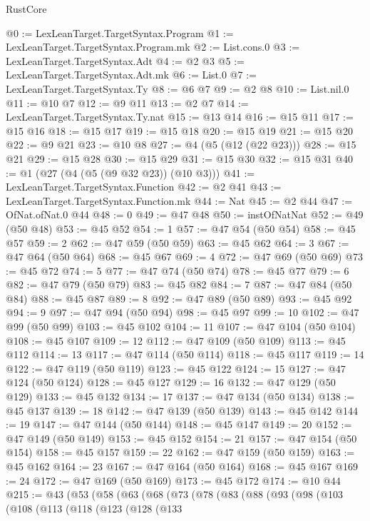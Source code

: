\begin{lexlean}{RustCore}
\begin{coremodule}
@0 := LexLeanTarget.TargetSyntax.Program
@1 := LexLeanTarget.TargetSyntax.Program.mk
@2 := List.cons.{0}
@3 := LexLeanTarget.TargetSyntax.Adt
@4 := @2 @3
@5 := LexLeanTarget.TargetSyntax.Adt.mk
@6 := List.{0}
@7 := LexLeanTarget.TargetSyntax.Ty
@8 := @6 @7
@9 := @2 @8
@10 := List.nil.{0}
@11 := @10 @7
@12 := @9 @11
@13 := @2 @7
@14 := LexLeanTarget.TargetSyntax.Ty.nat
@15 := @13 @14
@16 := @15 @11
@17 := @15 @16
@18 := @15 @17
@19 := @15 @18
@20 := @15 @19
@21 := @15 @20
@22 := @9 @21
@23 := @10 @8
@27 := @4 (@5 (@12 (@22 @23)))
@28 := @15 @21
@29 := @15 @28
@30 := @15 @29
@31 := @15 @30
@32 := @15 @31
@40 := @1 (@27 (@4 (@5 (@9 @32 @23)) (@10 @3)))
@41 := LexLeanTarget.TargetSyntax.Function
@42 := @2 @41
@43 := LexLeanTarget.TargetSyntax.Function.mk
@44 := Nat
@45 := @2 @44
@47 := OfNat.ofNat.{0} @44
@48 := 0
@49 := @47 @48
@50 := instOfNatNat
@52 := @49 (@50 @48)
@53 := @45 @52
@54 := 1
@57 := @47 @54 (@50 @54)
@58 := @45 @57
@59 := 2
@62 := @47 @59 (@50 @59)
@63 := @45 @62
@64 := 3
@67 := @47 @64 (@50 @64)
@68 := @45 @67
@69 := 4
@72 := @47 @69 (@50 @69)
@73 := @45 @72
@74 := 5
@77 := @47 @74 (@50 @74)
@78 := @45 @77
@79 := 6
@82 := @47 @79 (@50 @79)
@83 := @45 @82
@84 := 7
@87 := @47 @84 (@50 @84)
@88 := @45 @87
@89 := 8
@92 := @47 @89 (@50 @89)
@93 := @45 @92
@94 := 9
@97 := @47 @94 (@50 @94)
@98 := @45 @97
@99 := 10
@102 := @47 @99 (@50 @99)
@103 := @45 @102
@104 := 11
@107 := @47 @104 (@50 @104)
@108 := @45 @107
@109 := 12
@112 := @47 @109 (@50 @109)
@113 := @45 @112
@114 := 13
@117 := @47 @114 (@50 @114)
@118 := @45 @117
@119 := 14
@122 := @47 @119 (@50 @119)
@123 := @45 @122
@124 := 15
@127 := @47 @124 (@50 @124)
@128 := @45 @127
@129 := 16
@132 := @47 @129 (@50 @129)
@133 := @45 @132
@134 := 17
@137 := @47 @134 (@50 @134)
@138 := @45 @137
@139 := 18
@142 := @47 @139 (@50 @139)
@143 := @45 @142
@144 := 19
@147 := @47 @144 (@50 @144)
@148 := @45 @147
@149 := 20
@152 := @47 @149 (@50 @149)
@153 := @45 @152
@154 := 21
@157 := @47 @154 (@50 @154)
@158 := @45 @157
@159 := 22
@162 := @47 @159 (@50 @159)
@163 := @45 @162
@164 := 23
@167 := @47 @164 (@50 @164)
@168 := @45 @167
@169 := 24
@172 := @47 @169 (@50 @169)
@173 := @45 @172
@174 := @10 @44
@215 := @43
    (@53
      (@58
        (@63
          (@68
            (@73
              (@78
                (@83
                  (@88
                    (@93
                      (@98
                        (@103
                          (@108
                            (@113
                              (@118
                                (@123
                                  (@128
                                    (@133

\end{coremodule}
\end{lexlean}
